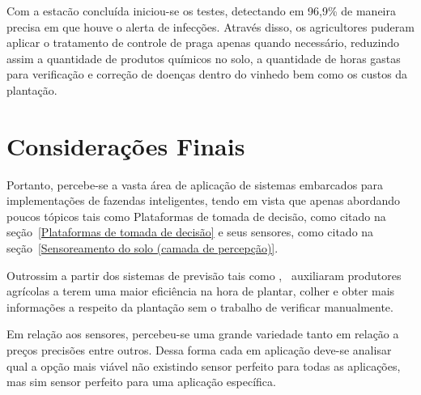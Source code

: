\documentclass[
article,			%
12pt,				%
oneside,			%
a4paper,			%
english,			%
brazil,				%
sumario=tradicional
]{abntex2}
\begin{document}
Com a estacão concluída iniciou-se os testes, detectando em 96,9\% de maneira precisa em que houve o alerta de infecções. Através disso, os agricultores puderam aplicar o tratamento de controle de praga apenas quando necessário, reduzindo assim a quantidade de produtos químicos no solo, a quantidade de horas gastas para verificação e correção de doenças dentro do vinhedo bem como os custos da plantação.

\section{Considerações Finais}
Portanto, percebe-se a vasta área de aplicação de sistemas embarcados para implementações de fazendas inteligentes, tendo em vista que apenas abordando poucos tópicos tais como Plataformas de tomada de decisão, como citado na seção~\ref{Plataformas de tomada de decisão} e seus sensores, como citado na seção~\ref{Sensoreamento do solo (camada de percepção)}.

Outrossim a partir dos sistemas de previsão tais como \cite{1},~\cite{2} auxiliaram produtores agrícolas a terem uma maior eficiência na hora de plantar, colher e obter mais informações a respeito da plantação sem o trabalho de verificar manualmente.

Em relação aos sensores, percebeu-se uma grande variedade tanto em relação a preços precisões entre outros. Dessa forma cada em aplicação deve-se analisar qual a opção mais viável não existindo sensor perfeito para todas as aplicações, mas sim sensor perfeito para uma aplicação específica.

\postextual

\cleardoublepage


%
%
\end{document}
